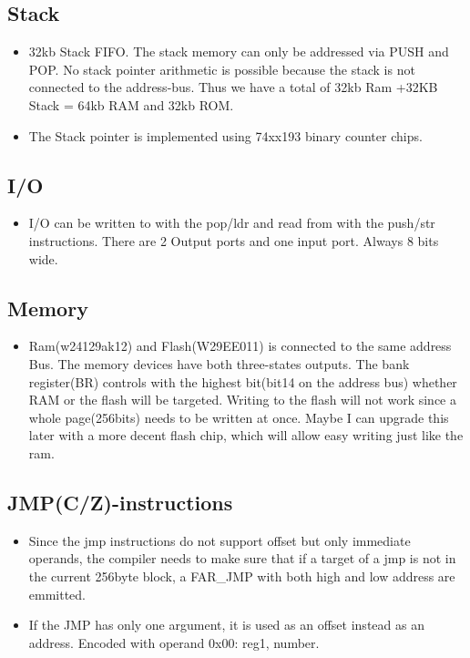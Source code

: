 \documentclass[a4paper, 12pt]{article}
\begin{document}
	\subsection {Stack}
	\begin{itemize}
		\item 32kb Stack FIFO. The stack memory can only be addressed via PUSH and POP. No stack pointer arithmetic is possible because the stack is not connected to the address-bus. Thus we have a total of 32kb Ram +32KB Stack = 64kb RAM and 32kb ROM.
		\item The Stack pointer is implemented using 74xx193 binary counter chips. 
	\end{itemize}

	\subsection{I/O}
	\begin{itemize}
		\item I/O can be written to with the pop/ldr and read from with the push/str instructions. There are 2 Output ports and one input port. Always 8 bits wide.
	\end{itemize}

	\subsection{Memory}
	\begin{itemize}
		\item Ram(w24129ak12) and Flash(W29EE011) is connected to the same address Bus. The memory devices have both three-states outputs. The bank register(BR) controls with the highest bit(bit14 on the address bus) whether RAM or the flash will be targeted. Writing to the flash will not work since a whole page(256bits) needs to be written at once. Maybe I can upgrade this later with a more decent flash chip, which will allow easy writing just like the ram.
	\end{itemize}

	\subsection{JMP(C/Z)-instructions}
	\begin{itemize}
		\item Since the jmp instructions do not support offset but only immediate operands, the compiler needs to make sure that if a target of a jmp is not in the current 256byte block, a FAR\_JMP with both  high and low address are emmitted.
		\item If the JMP has only one argument, it is used as an offset instead as an address. Encoded with operand 0x00: reg1, number.
	\end{itemize}
	\newpage
\end{document}
